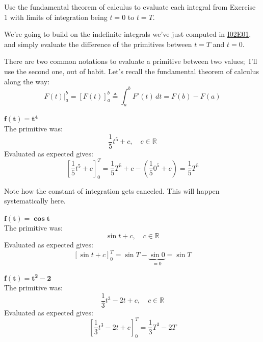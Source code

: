 \documentclass[solutions.tex]{subfiles}
\begin{document}
\maketitle
\begin{exercise} Use the fundamental theorem of calculus to
evaluate each integral from Exercise $1$ with limits of
integration being $t=0$ to $t=T$.
\end{exercise}
We're going to build on the indefinite integrals we've just computed in
\href{https://github.com/mbivert/ttm/blob/master/cm/I02E01.pdf}{I02E01},
and simply evaluate the difference of the primitives between $t=T$ and $t=0$.
\begin{remark} There are two common notations to evaluate a primitive between
two values; I'll use the second one, out of habit. Let's recall the fundamental
theorem of calculus along the way:
\[
	\boxed{\left.F(t)\right|_a^b = \left[F(t)\right]_a^b \triangleq \int_a^bF'(t)\,dt = F(b)-F(a)}
\]
\end{remark}
\hr
$\bm{f(t) = t^4}$\ \\
The primitive was:
\[ \frac15t^5 + c,\quad c\in\mathbb{R} \]
Evaluated as expected gives:
\[
	\left[\frac15t^5 + c\right]_0^T = \frac15T^5+c-(\frac150^5+c)=\boxed{\frac15T^5}
\]
\begin{remark} Note how the constant of integration gets canceled. This will
happen systematically here.
\end{remark}
\hr
$\bm{f(t) = \cos t}$\ \\
The primitive was:
\[ \sin t + c,\quad c\in\mathbb{R} \]
Evaluated as expected gives:
\[
	\left[\sin t + c\right]_0^T = \sin T - \underbrace{\sin 0}_{=0} = \boxed{\sin T}
\]

\hr
$\bm{f(t) = t^2 - 2}$\ \\
The primitive was:
\[ \frac13t^3-2t+c,\quad c\in\mathbb{R} \]
Evaluated as expected gives:
\[
	\left[\frac13t^3-2t+c\right]_0^T = \boxed{\frac13T^3-2T}
\]
\end{document}
